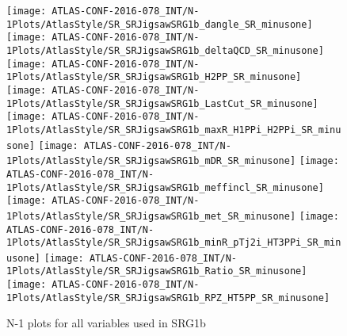 \begin{figure}[tbp]
\begin{center}

\texttt{[image: ATLAS-CONF-2016-078\_INT/N-1Plots/AtlasStyle/SR\_SRJigsawSRG1b\_dangle\_SR\_minusone]}
\texttt{[image: ATLAS-CONF-2016-078\_INT/N-1Plots/AtlasStyle/SR\_SRJigsawSRG1b\_deltaQCD\_SR\_minusone]}
\texttt{[image: ATLAS-CONF-2016-078\_INT/N-1Plots/AtlasStyle/SR\_SRJigsawSRG1b\_H2PP\_SR\_minusone]}
\texttt{[image: ATLAS-CONF-2016-078\_INT/N-1Plots/AtlasStyle/SR\_SRJigsawSRG1b\_LastCut\_SR\_minusone]}
\texttt{[image: ATLAS-CONF-2016-078\_INT/N-1Plots/AtlasStyle/SR\_SRJigsawSRG1b\_maxR\_H1PPi\_H2PPi\_SR\_minusone]}
\texttt{[image: ATLAS-CONF-2016-078\_INT/N-1Plots/AtlasStyle/SR\_SRJigsawSRG1b\_mDR\_SR\_minusone]}
\texttt{[image: ATLAS-CONF-2016-078\_INT/N-1Plots/AtlasStyle/SR\_SRJigsawSRG1b\_meffincl\_SR\_minusone]}
\texttt{[image: ATLAS-CONF-2016-078\_INT/N-1Plots/AtlasStyle/SR\_SRJigsawSRG1b\_met\_SR\_minusone]}
\texttt{[image: ATLAS-CONF-2016-078\_INT/N-1Plots/AtlasStyle/SR\_SRJigsawSRG1b\_minR\_pTj2i\_HT3PPi\_SR\_minusone]}
\texttt{[image: ATLAS-CONF-2016-078\_INT/N-1Plots/AtlasStyle/SR\_SRJigsawSRG1b\_Ratio\_SR\_minusone]}
\texttt{[image: ATLAS-CONF-2016-078\_INT/N-1Plots/AtlasStyle/SR\_SRJigsawSRG1b\_RPZ\_HT5PP\_SR\_minusone]}
\end{center}
\caption{N-1 plots for all variables used in SRG1b}
\label{fig:SR_SRJigsawSRG1b_mDR_SR_minusone}
\end{figure}

